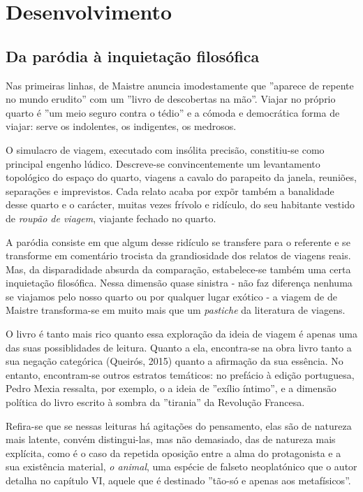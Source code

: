 \documentclass[12pt]{article}
\begin{document}
\section{Desenvolvimento}

\subsection{Da paródia à inquietação filosófica}

Nas primeiras linhas, de Maistre anuncia imodestamente que ''aparece
de repente no mundo erudito'' com um ''livro de descobertas na
mão''. Viajar no próprio quarto é ''um meio seguro contra o tédio'' e
a cómoda e democrática forma de viajar: serve os indolentes, os
indigentes, os medrosos.

O simulacro de viagem, executado com insólita precisão, constitiu-se
como principal engenho lúdico. Descreve-se convincentemente um
levantamento topológico do espaço do quarto, viagens a cavalo do
parapeito da janela, reuniões, separações e imprevistos. Cada relato
acaba por expõr também a banalidade desse quarto e o carácter, muitas
vezes frívolo e ridículo, do seu habitante vestido de \emph{roupão de
  viagem}, viajante fechado no quarto.

A paródia consiste em que algum desse ridículo se transfere para o
referente e se transforme em comentário trocista da grandiosidade dos
relatos de viagens reais. Mas, da disparadidade absurda da comparação,
estabelece-se também uma certa inquietação filosófica. Nessa dimensão
quase sinistra - não faz diferença nenhuma se viajamos pelo nosso
quarto ou por qualquer lugar exótico - a viagem de de Maistre
transforma-se em muito mais que um \emph{pastiche} da literatura de
viagens.

O livro é tanto mais rico quanto essa exploração da ideia de viagem é
apenas uma das suas possiblidades de leitura. Quanto a ela,
encontra-se na obra livro tanto a sua negação categórica (Queirós,
2015) quanto a afirmação da sua essência. No entanto, encontram-se
outros estratos temáticos: no prefácio à edição portuguesa, Pedro
Mexia ressalta, por exemplo, o a ideia de ''exílio íntimo'', e a
dimensão política do livro escrito à sombra da ''tirania'' da
Revolução Francesa.

Refira-se que se nessas leituras há agitações do pensamento, elas são
de natureza mais latente, convém distingui-las, mas não demasiado, das
de natureza mais explícita, como é o caso da repetida oposição entre a
alma do protagonista e a sua existência material, \emph{o animal}, uma
espécie de falseto neoplatónico que o autor detalha no capítulo VI,
aquele que é destinado ''tão-só e apenas aos metafísicos''.
\end{document}
